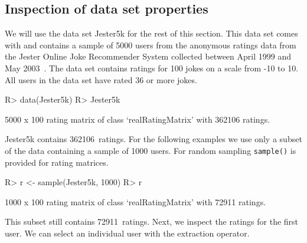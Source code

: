 \documentclass[nojss]{jss}
\newcommand{\func}[1]{\mbox{\texttt{#1()}}}
\begin{document}
\subsection{Inspection of data set properties}
We will use the data set Jester5k for the rest of this section.  This data set
comes with  and contains a sample of 5000 users from the
anonymous ratings data from the Jester Online Joke Recommender System collected
between April 1999 and May 2003~\citep{recommender:Goldberg:2001}. The
data set contains ratings for 100 jokes on a scale from -10 to 10. All
users in the data set have rated 36 or more jokes.

\begin{Schunk}
\begin{Sinput}
R> data(Jester5k)
R> Jester5k
\end{Sinput}
\begin{Soutput}
5000 x 100 rating matrix of class ‘realRatingMatrix’ with 362106 ratings.
\end{Soutput}
\end{Schunk}

Jester5k contains
362106~ratings. For the following examples we use
only a subset of the data containing a sample of 1000 users.
For random sampling \func{sample} is provided for rating matrices.

\begin{Schunk}
\begin{Sinput}
R> r <- sample(Jester5k, 1000)
R> r
\end{Sinput}
\begin{Soutput}
1000 x 100 rating matrix of class ‘realRatingMatrix’ with 72911 ratings.
\end{Soutput}
\end{Schunk}

This subset still contains 72911~ratings.
Next, we inspect the ratings for the first user. We can select
an individual user with the extraction operator.
\end{document}
